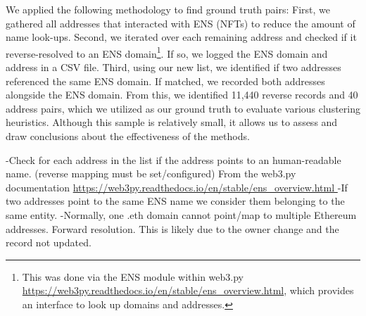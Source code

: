 \documentclass[12pt,a4paper,titlepage,oneside,english]{article}
\begin{document}
We applied the following methodology to find ground truth pairs: First, we gathered all addresses that interacted with ENS (NFTs) to reduce the amount of name look-ups. Second, we iterated over each remaining address and checked if it reverse-resolved to an ENS domain\footnote{This was done via the ENS module within web3.py \url{https://web3py.readthedocs.io/en/stable/ens_overview.html}, which provides an interface to look up domains and addresses.}. If so, we logged the ENS domain and address in a CSV file. Third, using our new list, we identified if two addresses referenced the same ENS domain. If matched, we recorded both addresses alongside the ENS domain. \newline
From this, we identified 11,440 reverse records and 40 address pairs, %
which we utilized as our ground truth to evaluate various clustering heuristics. Although this sample is relatively small, it allows us to assess and draw conclusions about the effectiveness of the methods.%

\iffalse
-Check for each address in the list if the address points to an human-readable name. (reverse mapping must be set/configured) From the web3.py documentation \url{https://web3py.readthedocs.io/en/stable/ens_overview.html } %
-If two addresses point to the same ENS name we consider them belonging to the same entity. 
-Normally, one .eth domain cannot point/map to multiple Ethereum addresses. Forward resolution. This is likely due to the owner change and the record not updated.

\end{document}
